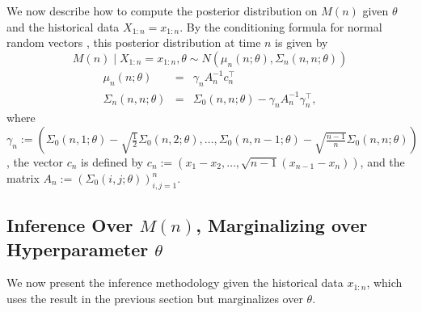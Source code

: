 \documentclass{wscpaperproc}
\theoremstyle{wsc}
\begin{document}
We now describe how to compute the posterior distribution on $M(n)$ given $\theta$ and the historical data $X_{1:n}=x_{1:n}$.  By the conditioning formula for normal random vectors \cite{glasserman:mc}, this posterior distribution at time $n$ is given by
\[
M\left(n\right)\mid X_{1:n} = x_{1:n},\theta\sim N\left(\mu_{n}\left(n;\theta\right),\Sigma_{n}\left(n,n;\theta\right)\right)
\]
\begin{eqnarray*}
\mu_{n}\left(n;\theta\right)  &=& \gamma_{n}A_{n}^{-1}c_{n}^\intercal\\
\Sigma_{n}\left(n,n;\theta\right) &=&  \Sigma_{0}\left(n,n;\theta\right)-\gamma_{n}A_{n}^{-1}\gamma_{n}^\intercal,
\end{eqnarray*}
where $\gamma_{n}:=\left(\Sigma_{0}\left(n,1;\theta\right)-\sqrt{\frac{1}{2}}\Sigma_{0}\left(n,2;\theta\right),\ldots,\Sigma_{0}\left(n,n-1;\theta\right)-\sqrt{\frac{n-1}{n}}\Sigma_{0}\left(n,n;\theta\right)\right)$, the vector $c_{n}$ is defined by 
$c_{n}:=\left(x_{1}-x_{2},\ldots,\sqrt{n-1}\left(x_{n-1}-x_{n}\right)\right)$,
and the matrix $A_{n}:=(\Sigma_{0}\left(i,j;\theta\right))_{i,j=1}^{n}$.

 


\subsection{Inference Over $M(n)$, Marginalizing over Hyperparameter $\theta$}
We now present the inference methodology given the historical data $x_{1:n}$, which uses the result in the previous section but marginalizes over $\theta$.
\end{document}
